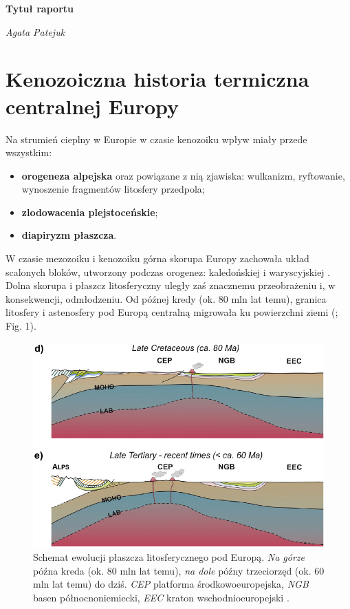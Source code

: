 \documentclass[11.5pt,twoside]{report}
\newcommand{\ct}[1]{\ignorespaces} %
\begin{document}
	
\begin{titlepage} %
	\centering
	\vspace*{5cm}
	{\Huge\bfseries Tytuł raportu\par}
	\vspace{1.3cm}
	{\Large\itshape Agata Patejuk}
\end{titlepage}

	
	\tableofcontents
	\thispagestyle{empty} %
	
	\chapter{Kenozoiczna historia termiczna centralnej Europy}
	
Na strumień cieplny w Europie w czasie kenozoiku wpływ miały przede wszystkim:
\begin{itemize}[nolistsep]
	\item \textbf{orogeneza alpejska} oraz powiązane z nią zjawiska: wulkanizm, ryftowanie, wynoszenie fragmentów litosfery przedpola;
	\item \textbf{zlodowacenia plejstoceńskie};
	\item \textbf{diapiryzm płaszcza}.
\end{itemize}

W czasie mezozoiku i kenozoiku górna skorupa Europy \ct{(??platformowa)} zachowała układ scalonych bloków, utworzony podczas orogenez: kaledońskiej i waryscyjskiej \ct{zrodlo?}. Dolna skorupa i płaszcz litosferyczny uległy zaś znacznemu przeobrażeniu i, w konsekwencji, odmłodzeniu\ct{zrodlo}. Od pó\'{z}nej kredy (ok. 80 mln lat temu), granica litosfery i astenosfery pod Europą centralną migrowała ku powierzchni ziemi (\cite{Meier.2016}; Fig. 1). 

\begin{figure}[h]
	\centering
	\includegraphics[width=0.5\linewidth]{../Termika/Meier2016}
	\caption{Schemat ewolucji płaszcza litosferycznego pod Europą. \textit{Na górze} późna kreda (ok. 80 mln lat temu), \textit{na dole} późny trzeciorzęd (ok. 60 mln lat temu) do dziś. \textit{CEP} platforma środkowoeuropejska, \textit{NGB} basen północnoniemiecki, \textit{EEC} kraton wschodnioeuropejski \parencite{Meier.2016}.}
	\label{Fig.}
\end{figure}
\end{document}

